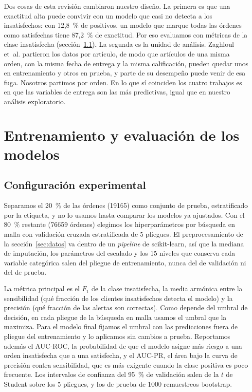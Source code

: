 \documentclass[journal]{IEEEtran}
\begin{document}
Dos cosas de esta revisión cambiaron nuestro diseño. La primera es que una exactitud alta puede convivir con un modelo que casi no detecta a los insatisfechos: con 12,8~\% de positivos, un modelo que marque todas las órdenes como satisfechas tiene 87,2~\% de exactitud. Por eso evaluamos con métricas de la clase insatisfecha (sección~\ref{sec:config}). La segunda es la unidad de análisis. Zaghloul et~al. partieron los datos por artículo, de modo que artículos de una misma orden, con la misma fecha de entrega y la misma calificación, pueden quedar unos en entrenamiento y otros en prueba, y parte de su desempeño puede venir de esa fuga. Nosotros partimos por orden. En lo que sí coinciden los cuatro trabajos es en que las variables de entrega son las más predictivas, igual que en nuestro análisis exploratorio.

\section{Entrenamiento y evaluación de los modelos}

\subsection{Configuración experimental}
\label{sec:config}

Separamos el 20~\% de las órdenes (\num{19165}) como conjunto de prueba, estratificado por la etiqueta, y no lo usamos hasta comparar los modelos ya ajustados. Con el 80~\% restante (\num{76659} órdenes) elegimos los hiperparámetros por búsqueda en malla con validación cruzada estratificada de 5 pliegues. El preprocesamiento de la sección~\ref{sec:datos} va dentro de un \emph{pipeline} de scikit-learn, así que la mediana de imputación, los parámetros del escalado y los 15 niveles que conserva cada variable categórica salen del pliegue de entrenamiento, nunca del de validación ni del de prueba.

La métrica principal es el $F_1$ de la clase insatisfecha, la media armónica entre la sensibilidad (qué fracción de los clientes insatisfechos detecta el modelo) y la precisión (qué fracción de las alertas son correctas). Como depende del umbral de decisión, en cada pliegue de la búsqueda en malla usamos el umbral que la maximiza. Para el modelo final fijamos el umbral con las predicciones fuera de pliegue del entrenamiento y lo aplicamos sin cambios a prueba. Reportamos además el AUC-ROC, la probabilidad de que el modelo asigne más riesgo a una orden insatisfecha que a una satisfecha, y el AUC-PR, el área bajo la curva de precisión contra sensibilidad, que es más exigente cuando la clase positiva es poco frecuente. Los intervalos de confianza del 95~\% de validación salen de la $t$ de Student sobre los 5 pliegues, y los de prueba de \num{1000} remuestreos bootstrap.
\end{document}
